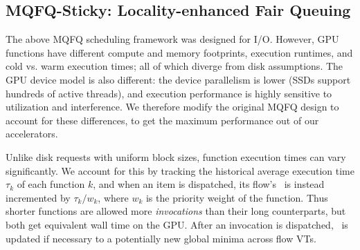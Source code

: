 \subsection{MQFQ-Sticky: Locality-enhanced Fair Queuing}
\label{sec:mq}


The above MQFQ scheduling framework was designed for I/O.
However, GPU functions have different compute and memory footprints, execution runtimes, and cold vs. warm execution times; all of which diverge from disk assumptions. 
The GPU device model is also different: the device parallelism is lower (SSDs support hundreds of active threads), and execution performance is highly sensitive to utilization and interference. 
We therefore modify the original MQFQ design to account for these differences, to get the maximum performance out of our accelerators. 


Unlike disk requests with uniform block sizes, function execution times can vary significantly.
We account for this by tracking the historical average execution time $\tau_k$ of each function $k$, and when an item is dispatched, its flow's \VT~is instead incremented by $\tau_k/w_k$, where $w_k$ is the priority weight of the function.
Thus shorter functions are allowed more \emph{invocations} than their long counterparts, but both get equivalent wall time on the GPU.
After an invocation is dispatched, \GlobVT~is updated if necessary to a potentially new global minima across flow VTs.

